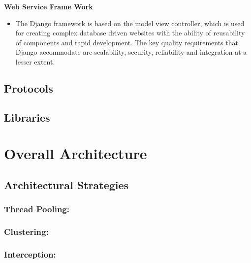 \documentclass[12pt]{article}
\begin{document}
\indent\indent \linebreak\linebreak\textbf{Web Service Frame Work}
\begin{itemize}
\item The Django framework is based on the model view controller, which is used for creating complex database driven websites with the ability of reusability of components and rapid development. 
The key quality requirements that Django accommodate are scalability, security, reliability and integration at a lesser extent.

\end{itemize}	
	
	\subsection{Protocols}
	
	
	\subsection{Libraries}


\section{Overall Architecture}



	\subsection{Architectural Strategies}
	
	

	\subsubsection {Thread Pooling:} 


	\subsubsection {Clustering:} 


	\subsubsection{Interception:}
	
\end{document}
